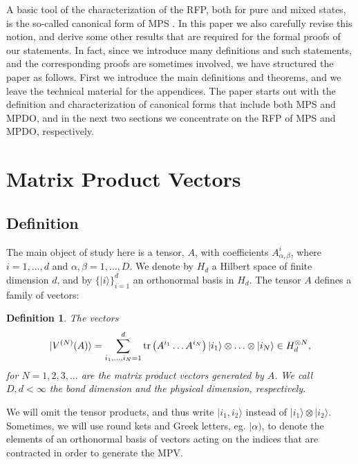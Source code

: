 \documentclass{elsarticle}
\newcommand{\be}{\begin{equation}}
\newcommand{\ee}{\end{equation}}
\newtheorem{defn}[thm]{Definition}
\begin{document}
A basic tool of the characterization of the RFP, both for pure and mixed states, is
the so-called canonical form of MPS \cite{David2006}. In this paper we also carefully
revise this notion, and derive some other results that are required for the
formal proofs of our statements. In fact, since we introduce many definitions and
such statements, and the corresponding proofs are sometimes involved, we have
structured the paper as follows. First we introduce the main definitions and
theorems, and we leave the technical material for the appendices. The paper
starts out with the definition and characterization of canonical forms that include
both MPS and MPDO, and in the next two sections we concentrate on the RFP of MPS and MPDO,
respectively.

\section{Matrix Product Vectors}\label{Sec:MPV}

\subsection{Definition}

The main object of study here is a tensor, $A$, with coefficients $A^i_{\alpha,\beta}$, where $i=1,\ldots,d$ and $\alpha,\beta=1,\ldots,D$. We denote by $H_d$ a Hilbert space of finite dimension $d$, and by $\{|i\rangle\}_{i=1}^d$ an orthonormal basis in $H_d$. The tensor $A$ defines a family of vectors:

\begin{defn}
The vectors
 \be
 \label{MPV}
 |V^{(N)}(A)\rangle = \sum_{i_1,\ldots,i_N=1}^d {\rm tr}\left( A^{i_1}\ldots  A^{i_N}\right) |i_1\rangle\otimes\ldots\otimes|i_N\rangle \in H_d^{\otimes N},
 \ee
for $N=1,2,3,\ldots$ are the {\em matrix product vectors generated} by $A$. We call $D,d<\infty$ the {\em bond dimension} and the {\em physical dimension}, respectively.
\end{defn}

We will omit the tensor products, and thus write $|i_1,i_2\rangle$ instead of $|i_1\rangle\otimes|i_2\rangle$. Sometimes, we will use round kets and Greek letters, eg. $|\alpha)$, to denote the elements of an orthonormal basis of vectors acting on the indices that are contracted in order to generate the MPV.
\end{document}
